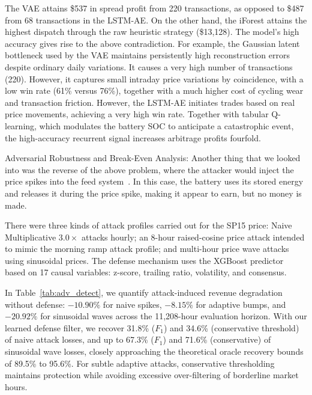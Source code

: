 \documentclass[journal]{IEEEtran}
\begin{document}
The VAE attains \$537 in spread profit from 220 transactions, as opposed to \$487 from 68 transactions in the LSTM-AE. On the other hand, the iForest attains the highest dispatch through the raw heuristic strategy (\$13,128). The model's high accuracy gives rise to the above contradiction. For example, the Gaussian latent bottleneck used by the VAE maintains persistently high reconstruction errors despite ordinary daily variations. It causes a very high number of transactions (220). However, it captures small intraday price variations by coincidence, with a low win rate (61\% versus 76\%), together with a much higher cost of cycling wear and transaction friction. However, the LSTM-AE initiates trades based on real price movements, achieving a very high win rate. Together with tabular Q-learning, which modulates the battery SOC to anticipate a catastrophic event, the high-accuracy recurrent signal increases arbitrage profits fourfold.

Adversarial Robustness and Break-Even Analysis: Another thing that we looked into was the reverse of the above problem, where the attacker would inject the price spikes into the feed system~\cite{Kurt_FDI_Detection}. In this case, the battery uses its stored energy and releases it during the price spike, making it appear to earn, but no money is made.

There were three kinds of attack profiles carried out for the SP15 price: Naive Multiplicative $3.0 \times$ attacks hourly; an 8-hour raised-cosine price attack intended to mimic the morning ramp attack profile; and multi-hour price wave attacks using sinusoidal prices. The defense mechanism uses the XGBoost predictor~\cite{XGBoost} based on 17 causal variables: z-score, trailing ratio, volatility, and consensus.

In Table~\ref{tab:adv_detect}, we quantify attack-induced revenue degradation without defense: $-10.90\%$ for naive spikes, $-8.15\%$ for adaptive bumps, and $-20.92\%$ for sinusoidal waves across the 11,208-hour evaluation horizon. With our learned defense filter, we recover 31.8\% ($F_1$) and 34.6\% (conservative threshold) of naive attack losses, and up to 67.3\% ($F_1$) and 71.6\% (conservative) of sinusoidal wave losses, closely approaching the theoretical oracle recovery bounds of 89.5\% to 95.6\%. For subtle adaptive attacks, conservative thresholding maintains protection while avoiding excessive over-filtering of borderline market hours.
\end{document}
